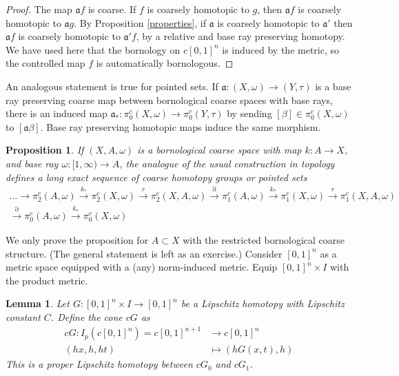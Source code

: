 \documentclass[a4paper,11pt]{article}
\theoremstyle{definition}
\theoremstyle{plain}
\newtheorem{prop}[definition]{Proposition}
\newtheorem{lemma}[definition]{Lemma}
\theoremstyle{remark}
\begin{document}
\begin{proof} The map $\mathfrak{a} f$ is coarse. If $f$ is coarsely homotopic to $g$, then $\mathfrak{a}f$ is coarsely homotopic to $\mathfrak{a}g$. By Proposition \ref{properties}, if $\mathfrak{a}$ is coarsely homotopic to $\mathfrak{a'}$ then $\mathfrak{a}f$ is coarsely homotopic to $\mathfrak{a}'f$, by a relative and base ray preserving homotopy. We have used here that the bornology on $c[0,1]^n$ is induced by the metric, so the controlled map $f$ is automatically bornologous. 
\end{proof}

An analogous statement is true for pointed sets. If $\mathfrak{a}:(X,\omega)\rightarrow (Y,\tau)$ is a base ray preserving coarse map between bornological coarse spaces with base rays, there is an induced map $\mathfrak{a}_{*}:\pi^c_0(X,\omega)\rightarrow \pi^c_0(Y,\tau)$ by sending $[\beta]\in \pi^c_0(X,\omega)$ to $[\mathfrak{a}\beta]$. Base ray preserving homotopic maps induce the same morphism. 

\begin{prop} \label{longexact} If $(X,A,\omega)$ is a bornological coarse space with map $k: A\rightarrow X$, and base ray $\omega:[1,\infty)\rightarrow A$, the analogue of the usual construction in topology defines a long exact sequence of coarse homotopy groups or pointed sets
\begin{align*}
\dots \rightarrow \pi_2^c(A,\omega)\xrightarrow{k_*} \pi_2^c(X,\omega)\xrightarrow{r} \pi_2^c(X,A,\omega) \xrightarrow{\partial} \pi_1^c(A,\omega)\xrightarrow{k_*} \pi_1^c(X,\omega)\xrightarrow{r} \pi_1^c(X,A,\omega)\\
\xrightarrow{\partial}  \pi_0^c(A,\omega)\xrightarrow{k_*} \pi_0^c(X,\omega)
\end{align*}
\end{prop}
We only prove the proposition for $A\subset X$ with the restricted bornological coarse structure. (The general statement is left as an exercise.) Consider $[0,1]^n$ as a metric space equipped with a (any) norm-induced metric. Equip $[0,1]^n \times I$ with the product metric. 

\begin{lemma} Let $G: [0,1]^n \times I \rightarrow [0,1]^n$ be a Lipschitz homotopy with Lipschitz constant $C$. Define the cone $cG$ as 
\begin{align*}
cG: I_{p} (c[0,1]^n)= c[0,1]^{n+1} &\rightarrow c[0,1]^n
\\ (hx,h,ht) &\mapsto (h G(x,t),h)
\end{align*}
This is a proper Lipschitz homotopy between $cG_0$ and $cG_1$. 
\end{lemma}
\end{document}
